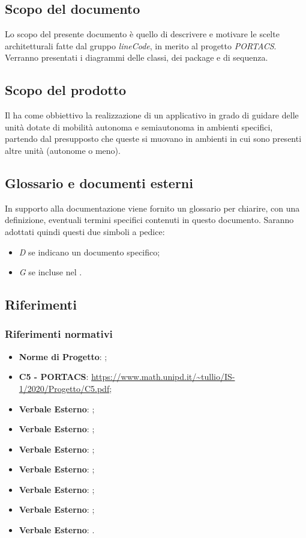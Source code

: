 \subsection{Scopo del documento}
Lo scopo del presente documento è quello di descrivere e motivare le scelte architetturali fatte dal gruppo \textit{lineCode}, in merito al progetto \textit{PORTACS}. Verranno presentati i diagrammi delle classi, dei package e di sequenza.

\subsection{Scopo del prodotto}
Il  ha come obbiettivo la realizzazione di un applicativo  in grado di guidare delle unità dotate di mobilità autonoma e semiautonoma in ambienti specifici, partendo dal presupposto che queste si muovano in ambienti in cui sono presenti altre unità (autonome o meno).

\subsection{Glossario e documenti esterni}
In supporto alla documentazione viene fornito un glossario per chiarire, con una definizione, eventuali termini specifici contenuti in questo documento. Saranno adottati quindi questi due simboli a pedice:
\begin{itemize}
	\item \textit{D} se indicano un documento specifico;
	\item \textit{G} se incluse nel .
\end{itemize}

\subsection{Riferimenti}
\subsubsection{Riferimenti normativi}
\begin{itemize}
	\item \textbf{Norme di Progetto}: ;
	\item \textbf{{ C5 - PORTACS}}: \url{https://www.math.unipd.it/~tullio/IS-1/2020/Progetto/C5.pdf};
	\item \textbf{Verbale Esterno}: ;
	\item \textbf{Verbale Esterno}: ;
	\item \textbf{Verbale Esterno}: ;
	\item \textbf{Verbale Esterno}: ;
	\item \textbf{Verbale Esterno}: ;
	\item \textbf{Verbale Esterno}: ;
    \item \textbf{Verbale Esterno}: .
\end{itemize}
